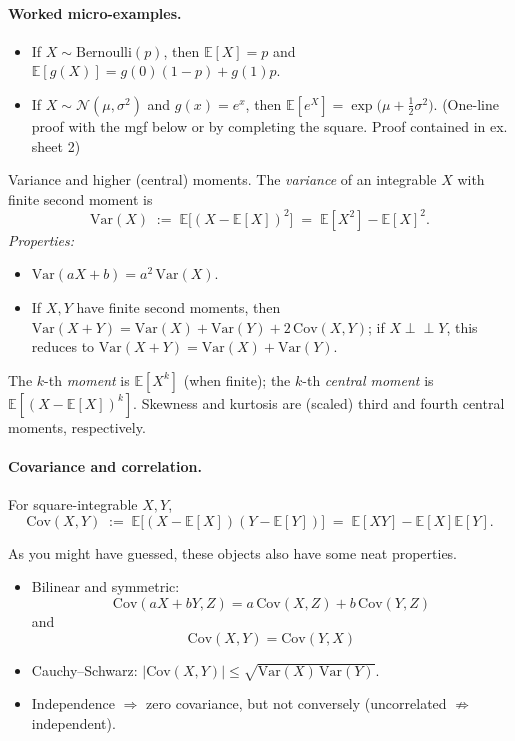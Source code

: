 \paragraph{Worked micro-examples.}
\begin{itemize}
\item If $X\sim \mathrm{Bernoulli}(p)$, then $\mathbb{E}[X]=p$ and $\mathbb{E}[g(X)]=g(0)(1-p)+g(1)p$.
\item If $X\sim \mathcal{N}(\mu,\sigma^2)$ and $g(x)=e^{x}$, then
$\mathbb{E}[e^{X}]=\exp\!\big(\mu+\tfrac{1}{2}\sigma^2\big)$.
(One-line proof with the mgf below or by completing the square. Proof contained in ex. sheet 2)
\end{itemize}

\begin{definition}
Variance and higher (central) moments.
The \emph{variance} of an integrable $X$ with finite second moment is
\[
\mathrm{Var}(X)\;:=\;\mathbb{E}\big[(X-\mathbb{E}[X])^2\big]
\;=\;\mathbb{E}[X^2]-\mathbb{E}[X]^2.
\]
\textit{Properties:}
\begin{itemize}
\item $\mathrm{Var}(aX+b)=a^2\,\mathrm{Var}(X)$.
\item If $X,Y$ have finite second moments, then 
$\mathrm{Var}(X+Y)=\mathrm{Var}(X)+\mathrm{Var}(Y)+2\,\mathrm{Cov}(X,Y)$; 
if $X\perp\!\!\!\perp Y$, this reduces to $\mathrm{Var}(X+Y)=\mathrm{Var}(X)+\mathrm{Var}(Y)$.
\end{itemize}
The $k$-th \emph{moment} is $\mathbb{E}[X^k]$ (when finite); the $k$-th \emph{central moment} is $\mathbb{E}[(X-\mathbb{E}[X])^k]$. 
Skewness and kurtosis are (scaled) third and fourth central moments, respectively.

\paragraph{Covariance and correlation.}
For square-integrable $X,Y$,
\[
\mathrm{Cov}(X,Y)\;:=\;\mathbb{E}\big[(X-\mathbb{E}[X])(Y-\mathbb{E}[Y])\big]
\;=\;\mathbb{E}[XY]-\mathbb{E}[X]\mathbb{E}[Y].
\]
\end{definition}

As you might have guessed, these objects also have some neat properties.
\begin{itemize}
\item Bilinear and symmetric: $$\mathrm{Cov}(aX+bY, Z)=a\,\mathrm{Cov}(X,Z)+b\,\mathrm{Cov}(Y,Z)$$ and $$\mathrm{Cov}(X,Y)=\mathrm{Cov}(Y,X)$$
\item Cauchy–Schwarz: $|\mathrm{Cov}(X,Y)|\le \sqrt{\mathrm{Var}(X)\,\mathrm{Var}(Y)}$.
\item Independence $\Rightarrow$ zero covariance, but not conversely (uncorrelated $\not\Rightarrow$ independent).
\end{itemize}
